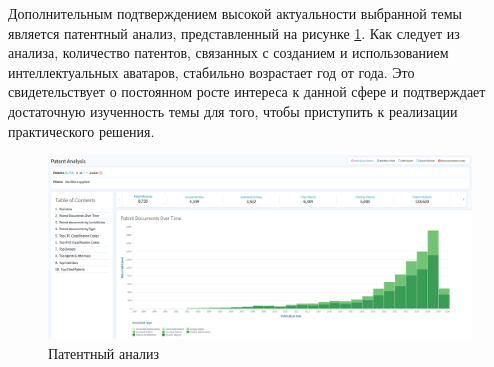 Дополнительным подтверждением высокой актуальности выбранной темы является патентный анализ, представленный на рисунке \ref{fig:patent-analysis}. Как следует из анализа, количество патентов, связанных с созданием и использованием интеллектуальных аватаров, стабильно возрастает год от года. Это свидетельствует о постоянном росте интереса к данной сфере и подтверждает достаточную изученность темы для того, чтобы приступить к реализации практического решения.

\begin{figure}[h!]
    \centering
    \includegraphics[width=1.0\linewidth]{images/patent-analysis.png}
    \caption{Патентный анализ}
    \label{fig:patent-analysis}
\end{figure}

